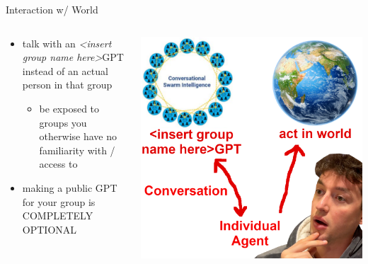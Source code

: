 \documentclass[aspectratio=169]{beamer}
\begin{document}
\begin{frame}{Interaction w/ World}
\begin{columns}[T]
    \begin{column}[T]{0.5\textwidth}
        \begin{itemize}
            \item talk with an \textit{<insert group name here>}GPT instead of an actual person in that group
            \begin{itemize}
                \item be exposed to groups you otherwise have no familiarity with / access to
            \end{itemize}
            \item making a public GPT for your group is COMPLETELY OPTIONAL
        \end{itemize}
    \end{column}
    \begin{column}{0.5\textwidth}
        \includegraphics[height=0.8\textheight]{imgs/CSI_section/agency.png}
    \end{column}
\end{columns}
\end{frame}
\end{document}
